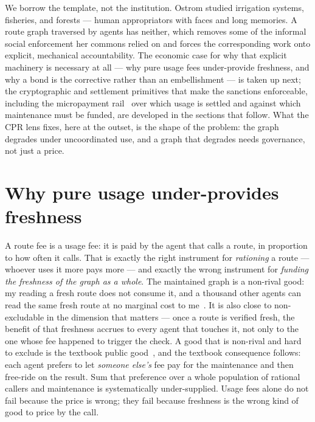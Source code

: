 \documentclass[11pt]{article}
\begin{document}
We borrow the template, not the institution. Ostrom studied irrigation systems,
fisheries, and forests --- human appropriators with faces and long memories. A
route graph traversed by agents has neither, which removes some of the
informal social enforcement her commons relied on and forces the
corresponding work onto explicit, mechanical accountability. The economic case
for why that explicit machinery is necessary at all --- why pure usage fees
under-provide freshness, and why a bond is the corrective rather than an
embellishment --- is taken up next; the cryptographic and settlement primitives
that make the sanctions enforceable, including the micropayment rail~\cite{x402}
over which usage is settled and against which maintenance must be funded, are
developed in the sections that follow. What the CPR lens fixes, here
at the outset, is the shape of the problem: the graph degrades under uncoordinated
use, and a graph that degrades needs governance, not just a price.

\section{Why pure usage under-provides freshness}

A route fee is a usage fee: it is paid by the agent that calls a route, in
proportion to how often it calls. That is exactly the right instrument for
\emph{rationing} a route --- whoever uses it more pays more --- and exactly the
wrong instrument for \emph{funding the freshness of the graph as a whole}. The
maintained graph is a non-rival good: my reading a fresh route does not consume
it, and a thousand other agents can read the same fresh route at no marginal cost
to me~\cite{samuelson}. It is also close to non-excludable in the dimension that
matters --- once a route is verified fresh, the benefit of that freshness accrues
to every agent that touches it, not only to the one whose fee happened to trigger
the check. A good that is non-rival and hard to exclude is the textbook public
good~\cite{samuelson}, and the textbook consequence follows: each agent prefers to
let \emph{someone else's} fee pay for the maintenance and then free-ride on the
result. Sum that preference over a whole population of rational callers and
maintenance is systematically under-supplied. Usage fees alone do not fail because
the price is wrong; they fail because freshness is the wrong kind of good to price
by the call.
\end{document}
